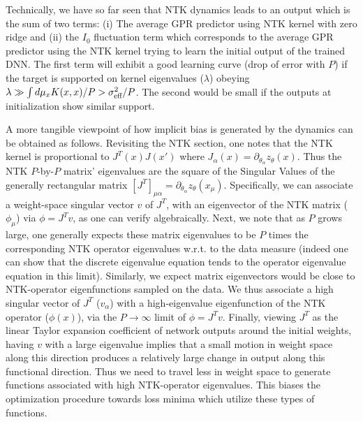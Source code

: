 Technically, we have so far seen that NTK dynamics leads to an output which is the sum of two terms: (i) The average GPR predictor using NTK kernel with zero ridge and (ii) the $I_0$ fluctuation term which corresponds to the average GPR predictor using the NTK kernel trying to learn the initial output of the trained DNN. The first term will exhibit a good learning curve (drop of error with $P$) if the target is supported on kernel eigenvalues ($\lambda$) obeying $\lambda \gg \int d\mu_x K(x,x)/P > \sigma_{\text{eff}}^2/P$. The second would be small if the outputs at initialization show similar support. 

A more tangible viewpoint of how implicit bias is generated by the dynamics can be obtained as follows. Revisiting the NTK section, one notes that the NTK kernel is proportional to $J^T(x) J(x')$ where $J_{\alpha}(x) = \partial_{\theta_{\alpha}} z_{\theta}(x)$. Thus the NTK $P$-by-$P$ matrix' eigenvalues are the square of the Singular Values of the generally rectangular matrix $[J^T]_{\mu \alpha}=\partial_{\theta_{\alpha}}z_{\theta}(x_{\mu})$. Specifically, we can associate a weight-space singular vector $v$ of $J^T$, with an eigenvector of the NTK matrix ($\phi_{\mu}$) via $\phi = J^T v$, as one can verify algebraically. Next, we note that as $P$ grows large, one generally expects these matrix eigenvalues to be $P$ times the corresponding NTK operator eigenvalues w.r.t. to the data measure (indeed one can show that the discrete eigenvalue equation tends to the operator eigenvalue equation in this limit). Similarly, we expect matrix eigenvectors would be close to NTK-operator eigenfunctions sampled on the data. We thus associate a high singular vector of $J^T$ ($v_{\alpha}$) with a high-eigenvalue eigenfunction of the NTK operator ($\phi(x)$), via the $P \rightarrow \infty$ limit of $\phi =J^T v$. Finally, viewing $J^T$ as the linear Taylor expansion coefficient of network outputs around the initial weights, having $v$ with a large eigenvalue implies that a small motion in weight space along this direction produces a relatively large change in output along this functional direction. Thus we need to travel less in weight space to generate functions associated with high NTK-operator eigenvalues. This biases the optimization procedure towards loss minima which utilize these types of functions.  

